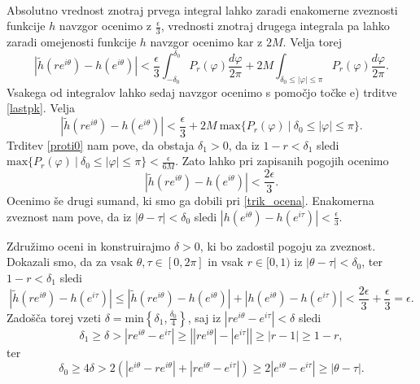 \documentclass[mat1, tisk]{fmfdelo}
\begin{document}
\begin{dokaz}
\begin{align*}
        \end{align*}
        Absolutno vrednost znotraj prvega integral lahko zaradi enakomerne zveznosti funkcije $h$ navzgor ocenimo z $\frac{\epsilon}{3}$, vrednosti znotraj drugega integrala pa lahko zaradi omejenosti funkcije $h$ navzgor ocenimo kar z $2M$. Velja torej
        $$
        \left|\widetilde{h}(re^{i\theta}) - h(e^{i\theta})\right| < \frac{\epsilon}{3} \int_{-\delta_0}^{\delta_0}{P_r(\varphi) \frac{d\varphi}{2\pi}} + 2M\int_{\delta_0 \leq |\varphi| \leq \pi}{P_r(\varphi)\frac{d\varphi}{2\pi}}.
        $$
        Vsakega od integralov lahko sedaj navzgor ocenimo s pomočjo točke e) trditve \ref{lastpk}. Velja
        $$
        \left|\widetilde{h}(re^{i\theta}) - h(e^{i\theta})\right| < \frac{\epsilon}{3}  + 2M~\text{max}\{P_r(\varphi)~| ~\delta_0 \leq |\varphi| \leq \pi \}.
        $$
        Trditev \ref{proti0} nam pove, da obstaja $\delta_1 >0$, da iz $1 - r < \delta_1$ sledi $\text{max}\{P_r(\varphi)~| ~\delta_0 \leq |\varphi| \leq \pi \} < \frac{\epsilon}{6M}$.
        Zato lahko pri zapisanih pogojih ocenimo
        $$
        \left|\widetilde{h}(re^{i\theta}) - h(e^{i\theta})\right| < \frac{2 \epsilon}{3}.
        $$
        Ocenimo še drugi sumand, ki smo ga dobili pri \eqref{trik_ocena}. Enakomerna zveznost nam pove, da iz $|\theta - \tau| < \delta_0$ sledi $|h\left(e^{i\theta}\right) - h\left(e^{i\tau}\right)| < \frac{\epsilon}{3}$.
        
        Združimo oceni in konstruirajmo $\delta>0$, ki bo zadostil pogoju za zveznost. Dokazali smo, da za vsak $\theta, \tau \in [0,2\pi]$ in vsak $r \in [0,1)$ iz $|\theta - \tau| < \delta_0$, ter $1- r < \delta_1$ sledi
        $$
        \left|\widetilde{h}(r e^{i \theta}) - h(e^{i\tau})\right| \leq \left|\widetilde{h}(re^{i\theta}) - h(e^{i\theta})\right| + \left|h\left(e^{i\theta}\right) - h\left(e^{i\tau}\right)\right| < \frac{2 \epsilon}{3} + \frac{\epsilon}{3} = \epsilon.
        $$
        Zadošča torej vzeti $\delta = \text{min}\left\{\delta_1, \frac{\delta_0}{4}\right\}$, saj iz $|r e^{i \theta} - e^{i\tau}| < \delta$ sledi
        $$ 
            \delta_1 \geq \delta > |r e^{i \theta} - e^{i\tau}| \geq \left||r e^{i \theta}| - |e^{i\tau}|\right| \geq |r - 1| \geq 1 -r, 
        $$
        ter
        $$ 
            \delta_0 \geq 4 \delta > 2 \left(\left| e^{i \theta} - r e^{i\theta} \right| +  \left|r e^{i\theta} - e^{i\tau} \right| \right) \geq 2 \left|e^{i\theta} - e^{i\tau} \right| \geq |\theta - \tau|.
        $$
    \end{dokaz}
\end{document}
